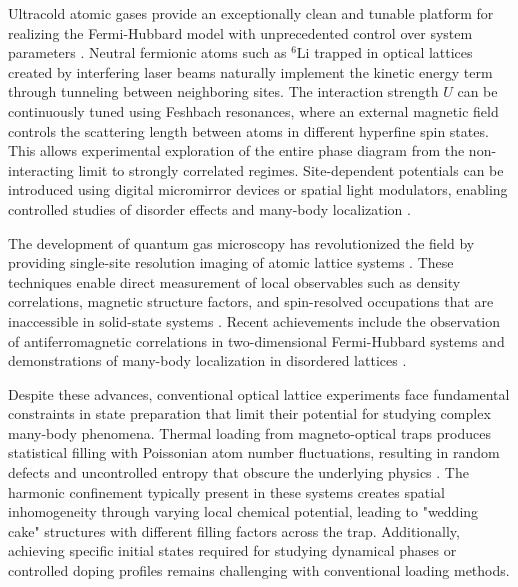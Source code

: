 
Ultracold atomic gases provide an exceptionally clean and tunable platform for realizing the Fermi-Hubbard model with unprecedented control over system parameters \cite{esslinger_fermi-hubbard_2010,gross_quantum_2017}. Neutral fermionic atoms such as $^6$Li trapped in optical lattices created by interfering laser beams naturally implement the kinetic energy term through tunneling between neighboring sites. The interaction strength $U$ can be continuously tuned using Feshbach resonances, where an external magnetic field controls the scattering length between atoms in different hyperfine spin states. This allows experimental exploration of the entire phase diagram from the non-interacting limit to strongly correlated regimes. Site-dependent potentials can be introduced using digital micromirror devices or spatial light modulators, enabling controlled studies of disorder effects and many-body localization \cite{choi_exploring_2016,schreiber_observation_2015}.

The development of quantum gas microscopy has revolutionized the field by providing single-site resolution imaging of atomic lattice systems \cite{bakr_quantum_2009,sherson_single-atom-resolved_2010}. These techniques enable direct measurement of local observables such as density correlations, magnetic structure factors, and spin-resolved occupations that are inaccessible in solid-state systems \cite{gross_quantum_2021}. Recent achievements include the observation of antiferromagnetic correlations in two-dimensional Fermi-Hubbard systems \cite{mazurenko_cold-atom_2017,parsons_site-resolved_2016} and demonstrations of many-body localization in disordered lattices \cite{bordia_probing_2017}.

Despite these advances, conventional optical lattice experiments face fundamental constraints in state preparation that limit their potential for studying complex many-body phenomena. Thermal loading from magneto-optical traps produces statistical filling with Poissonian atom number fluctuations, resulting in random defects and uncontrolled entropy that obscure the underlying physics \cite{esslinger_fermi-hubbard_2010}. The harmonic confinement typically present in these systems creates spatial inhomogeneity through varying local chemical potential, leading to "wedding cake" structures with different filling factors across the trap. Additionally, achieving specific initial states required for studying dynamical phases or controlled doping profiles remains challenging with conventional loading methods.

